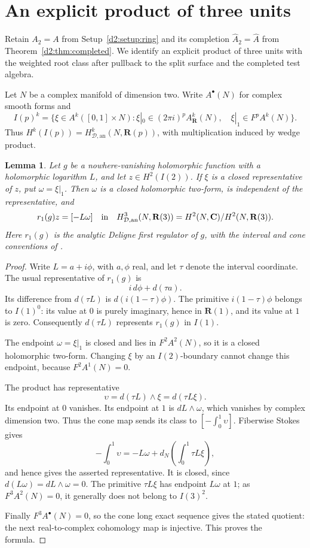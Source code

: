 \documentclass[11pt,a4paper]{amsart}
\numberwithin{equation}{section}
\newtheorem{lemma}[theorem]{Lemma}
\theoremstyle{definition}
\theoremstyle{remark}
\begin{document}
\section{An explicit product of three units}
\label{d2ext:sec-explicit-triple}

Retain $A_2=A$ from Setup~\ref{d2:setup:ring} and its
completion $\widehat A_2=\widehat A$ from Theorem~\ref{d2:thm:completed}.
We identify an explicit product of three units with the weighted
root class after pullback to the split surface and the completed test algebra.

Let $N$ be a complex manifold of dimension two. Write $A^\bullet(N)$
for complex smooth forms and
\[
 I(p)^k=\{\xi\in A^k([0,1]\times N):
 \xi|_0\in (2\pi i)^pA^k_{\mathbf R}(N),\quad
 \xi|_1\in F^pA^k(N)\}.
\]
Thus $H^k(I(p))=H^k_{\mathcal D,\mathrm{an}}(N,\mathbf R(p))$,
with multiplication induced by wedge product.

\begin{lemma}\label{d2ext:interval-product}
Let $g$ be a nowhere-vanishing holomorphic function with a holomorphic
logarithm $L$, and let $z\in H^2(I(2))$. If $\xi$ is a closed
representative of $z$, put $\omega=\xi|_1$. Then $\omega$ is a
closed holomorphic two-form, is independent of the representative,
and
\[
 r_1(g)z=[-L\omega]\quad\hbox{in}\quad
 H^3_{\mathcal D,\mathrm{an}}(N,\mathbf R(3))
 =H^2(N,\mathbf C)/H^2(N,\mathbf R(3)).
\]
Here $r_1(g)$ is the analytic Deligne first regulator of $g$, with
the interval and cone conventions of
\cite[Definition~2.7 and Proposition~2.8]{BunkeTamme}.
\end{lemma}

\begin{proof}
Write $L=a+i\phi$, with $a,\phi$ real, and let $\tau$ denote the
interval coordinate. The usual representative of $r_1(g)$ is
\[
 i\,d\phi+d(\tau a).
\]
Its difference from $d(\tau L)$ is
$d(i(1-\tau)\phi)$. The primitive $i(1-\tau)\phi$ belongs to
$I(1)^0$: its value at $0$ is purely imaginary, hence in
$\mathbf R(1)$, and its value at $1$ is zero. Consequently
$d(\tau L)$ represents $r_1(g)$ in $I(1)$.

The endpoint $\omega=\xi|_1$ is closed and lies in $F^2A^2(N)$,
so it is a closed holomorphic two-form. Changing $\xi$ by an
$I(2)$-boundary cannot change this endpoint, because
$F^2A^1(N)=0$.

The product has representative
\[
 \upsilon=d(\tau L)\wedge\xi=d(\tau L\xi).
\]
Its endpoint at $0$ vanishes. Its endpoint at $1$ is
$dL\wedge\omega$, which vanishes by complex dimension two.
Thus the cone map sends its class to
$[-\int_0^1\upsilon]$. Fiberwise Stokes gives
\[
 -\int_0^1\upsilon
 =-L\omega+d_N\!\left(\int_0^1\tau L\xi\right),
\]
and hence gives the asserted representative. It is closed, since
$d(L\omega)=dL\wedge\omega=0$. The primitive $\tau L\xi$
has endpoint $L\omega$ at $1$; as $F^3A^2(N)=0$, it generally
does not belong to $I(3)^2$.

Finally $F^3A^\bullet(N)=0$, so the cone long exact sequence gives
the stated quotient: the next real-to-complex cohomology map is
injective. This proves the formula.
\end{proof}
\end{document}
